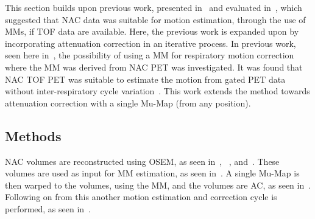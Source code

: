             This section builds upon previous work, presented in~ and evaluated in~, which suggested that \gls{NAC} data was suitable for motion estimation, through the use of \glspl{MM}, if \gls{TOF} data are available. Here, the previous work is expanded upon by incorporating attenuation correction in an iterative process. In previous work, seen here in~, the possibility of using a \gls{MM} for respiratory motion correction where the \gls{MM} was derived from \gls{NAC} \gls{PET} was investigated. It was found that \gls{NAC} \gls{TOF} \gls{PET} was suitable to estimate the motion from gated \gls{PET} data without inter-respiratory cycle variation~\parencite{Whitehead2019ImpactPET}. This work extends the method towards attenuation correction with a single \gls{Mu-Map} (from any position).
        
        \subsection{Methods} \label{sec:pet_ct_respiratory_motion_correction_with_a_single_attenuation_map_using_nac_derived_deformation_fields_methods}
            \gls{NAC} volumes are reconstructed using \gls{OSEM}, as seen in~, ~, and~. These volumes are used as input for \gls{MM} estimation, as seen in~. A single \gls{Mu-Map} is then warped to the volumes, using the \gls{MM}, and the volumes are \gls{AC}, as seen in~. Following on from this another motion estimation and correction cycle is performed, as seen in~.
            

